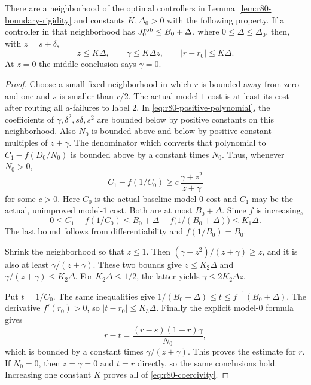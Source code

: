 \begin{lemma}
\label{lem:r80-boundary-coercivity}
There are a neighborhood of the optimal controllers in
Lemma~\ref{lem:r80-boundary-rigidity} and constants $K,\Delta_0>0$
with the following property.  If a controller in that neighborhood
has $J_0^{\rm rob}\le B_0+\Delta$, where
$0\le\Delta\le\Delta_0$, then,
with $z=s+\delta$,
\begin{equation}\label{eq:r80-coercivity}
 z\le K\Delta,\qquad
 \gamma\le K\Delta z,\qquad
 |r-r_0|\le K\Delta.
\end{equation}
At $z=0$ the middle conclusion says $\gamma=0$.
\end{lemma}
\begin{proof}
Choose a small fixed neighborhood in which $r$ is bounded away
from zero and one and $s$ is smaller than $r/2$.
The actual model-$1$ cost is at least its cost after routing all
$a$-failures to label $2$.  In
\eqref{eq:r80-positive-polynomial}, the coefficients of
$\gamma,\delta^2,s\delta,s^2$ are bounded below by positive
constants on this neighborhood.  Also
$N_0$ is bounded above and below by positive constant multiples
of $z+\gamma$.  The denominator which converts that polynomial
to $C_1-f(D_0/N_0)$ is bounded above by a constant times $N_0$.
Thus, whenever $N_0>0$,
\begin{equation}\label{eq:r80-coercivity-core}
 C_1-f(1/C_0)\ge
 c\,\frac{\gamma+z^2}{z+\gamma}
\end{equation}
for some $c>0$.  Here $C_0$ is the actual baseline model-$0$
cost and $C_1$ may be the actual, unimproved model-$1$ cost.
Both are at most $B_0+\Delta$.  Since $f$ is increasing,
\[
 0\le C_1-f(1/C_0)
   \le B_0+\Delta-f\bigl(1/(B_0+\Delta)\bigr)
   \le K_1\Delta.
\]
The last bound follows from differentiability and
$f(1/B_0)=B_0$.

Shrink the neighborhood so that $z\le1$.  Then
$(\gamma+z^2)/(z+\gamma)\ge z$, and it is also at least
$\gamma/(z+\gamma)$.  These two bounds give
$z\le K_2\Delta$ and
$\gamma/(z+\gamma)\le K_2\Delta$.
For $K_2\Delta\le1/2$, the latter yields
$\gamma\le2K_2\Delta z$.

Put $t=1/C_0$.  The same inequalities give
$1/(B_0+\Delta)\le t\le f^{-1}(B_0+\Delta)$.
The derivative $f'(r_0)>0$, so $|t-r_0|\le K_3\Delta$.
Finally the explicit model-$0$ formula gives
\[
 r-t=\frac{(r-s)(1-r)\gamma}{N_0},
\]
which is bounded by a constant times
$\gamma/(z+\gamma)$.  This proves the estimate for $r$.
If $N_0=0$, then $z=\gamma=0$ and $t=r$ directly, so the
same conclusions hold.  Increasing one constant $K$ proves
all of \eqref{eq:r80-coercivity}.
\end{proof}

